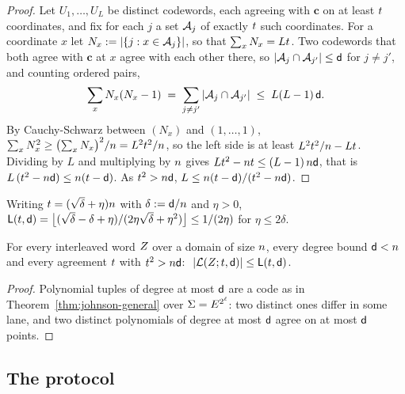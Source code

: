 \begin{proof}
Let $U_1, \dots, U_L$ be distinct codewords, each agreeing with $\mathbf{c}$ on at least $t$ coordinates, and fix for each $j$ a set $\mathcal{A}_j$ of exactly $t$ such coordinates. For a coordinate $x$ let $N_x := |\{ j : x \in \mathcal{A}_j \}|$, so that $\sum_x N_x = L t$. Two codewords that both agree with $\mathbf{c}$ at $x$ agree with each other there, so $|\mathcal{A}_j \cap \mathcal{A}_{j'}| \le \mathsf{d}$ for $j \neq j'$, and counting ordered pairs,
\[
\sum_x N_x (N_x - 1) \;=\; \sum_{j \neq j'} |\mathcal{A}_j \cap \mathcal{A}_{j'}| \;\le\; L(L-1)\, \mathsf{d} .
\]
By Cauchy-Schwarz between $(N_x)$ and $(1,\dots, 1)$, $\sum_x N_x^2 \ge \bigl(\sum_x N_x\bigr)^2/n = L^2t^2/n$, so the left side is at least $L^2t^2/n - Lt$. Dividing by $L$ and multiplying by $n$ gives $Lt^2-nt\le(L-1)\,n\mathsf{d}$, that is $L\,(t^2-n\mathsf{d})\le n(t-\mathsf{d})$. As $t^2>n\mathsf{d}$, $L\le n(t-\mathsf{d})/(t^2-n\mathsf{d})$.
\end{proof}

\begin{remark}
Writing $t=(\sqrt{\delta}+\eta)n$ with $\delta:=\mathsf{d}/n$ and $\eta>0$, $\mathsf{L}(t,\mathsf{d})=\bigl\lfloor(\sqrt\delta-\delta+\eta)/(2\eta\sqrt\delta+\eta^2)\bigr\rfloor\le1/(2\eta)$ for $\eta\le2\delta$.
\end{remark}

\begin{corollary}\label{thm:johnson-interleaved}
For every interleaved word $Z$ over a domain of size $n$, every degree bound $\mathsf{d}<n$ and every agreement $t$ with $t^2>n\mathsf{d}$: $\ |\mathcal{L}(Z;t,\mathsf{d})| \le \mathsf{L}(t,\mathsf{d})$.
\end{corollary}

\begin{proof}
Polynomial tuples of degree at most $\mathsf{d}$ are a code as in Theorem~\ref{thm:johnson-general} over $\Sigma=E^{2^\ell}$: two distinct ones differ in some lane, and two distinct polynomials of degree at most $\mathsf{d}$ agree on at most $\mathsf{d}$ points.
\end{proof}


\subsection{The protocol}\label{sec:protocol}


